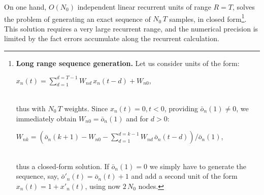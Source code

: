 On one hand, $O(N_0)$ independent linear recurrent units of range $R=T$, solves the problem of generating an exact sequence of $N_0 \, T$ samples, in closed form\footnote{{\bf Long range sequence generation.} Let us consider units of the form:
 \\\centerline{$x_n(t) = \sum_{d = 1}^{d = T-1} W_{nd} \, x_n(t-d) + W_{n0}$,}\\ thus with $N_0 \, T$ weights. Since $x_n(t) = 0, t < 0$, providing $\bar{o}_n(1) \neq 0$, we immediately obtain $W_{n0} = \bar{o}_n(1)$ and for $d > 0$: \\ \centerline{$W_{nk} = (\bar{o}_n(k+1) - W_{n0} - \sum_{d = 1}^{d = k-1} W_{nd} \, \bar{o}_n(t-d)) / \bar{o}_n(1)$,} \\ thus a closed-form solution. If $\bar{o}_n(1) = 0$ we simply have to generate the sequence, say, $\bar{o}'_n(t) = \bar{o}_n(t) +1$ and add a second unit of the form $x_n(t) = 1 + x'_n(t)$, using now $2\, N_0$ nodes.}. This solution requires a very large recurrent range, and the numerical precision is limited by the fact errors accumulate along the recurrent calculation.

